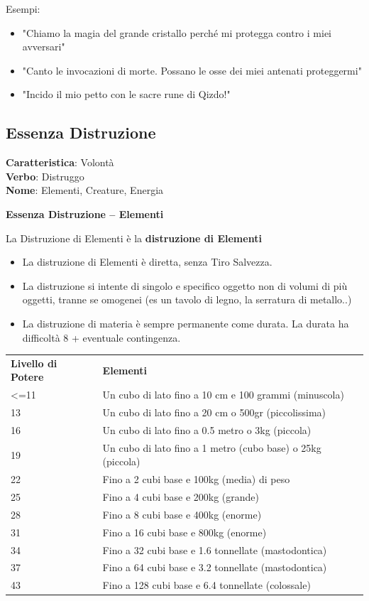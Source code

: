 \documentclass[a4paper,11pt,twoside,openany]{book}
\begin{document}
\bigskip

Esempi:
\begin{itemize}
	\item
	      "Chiamo la magia del grande cristallo perché mi protegga contro i miei avversari"
	\item
	      "Canto le invocazioni di morte. Possano le osse dei miei antenati proteggermi"
	\item
	      "Incido il mio petto con le sacre rune di Qizdo!"
\end{itemize}

\pagebreak

\subsection{Essenza Distruzione}

\textbf{Caratteristica}: Volontà\\
\textbf{Verbo}: Distruggo\\
\textbf{Nome}: Elementi, Creature, Energia\\

\label{essenza-distruzione---volonta}

\textbf{Essenza Distruzione -- Elementi}

La Distruzione di Elementi è la \textbf{distruzione di Elementi}
\begin{itemize}
	\item
	      La distruzione di Elementi è diretta, senza Tiro Salvezza.
	\item
	      La distruzione si intente di singolo e specifico oggetto non di volumi di più oggetti, tranne se omogenei (es un tavolo di legno, la serratura di metallo..)
	\item
	      La distruzione di materia è sempre permanente come durata. La durata ha difficoltà 8 + eventuale contingenza.
\end{itemize}

\bigskip


\begin{tabularx}{\textwidth}{lX}
	\toprule
	\textbf{Livello di Potere} & \textbf{Elementi}\tabularnewline
	\textless=11               & Un cubo di lato fino a 10 cm e 100 grammi (minuscola)\tabularnewline
	13          & Un cubo di lato fino a 20 cm o 500gr (piccolissima)\tabularnewline
	16          & Un cubo di lato fino a 0.5 metro o 3kg (piccola)\tabularnewline
	19          & Un cubo di lato fino a 1 metro (cubo base) o 25kg (piccola)\tabularnewline
	22          & Fino a 2 cubi base e 100kg (media) di peso\tabularnewline
	25          & Fino a 4 cubi base e 200kg (grande)\tabularnewline
	28          & Fino a 8 cubi base e 400kg (enorme)\tabularnewline
	31          & Fino a 16 cubi base e 800kg (enorme)\tabularnewline
	34          & Fino a 32 cubi base e 1.6 tonnellate (mastodontica)\tabularnewline
	37          & Fino a 64 cubi base e 3.2 tonnellate (mastodontica)\tabularnewline
	43          & Fino a 128 cubi base e 6.4 tonnellate (colossale)\tabularnewline
\end{tabularx}
\end{document}
